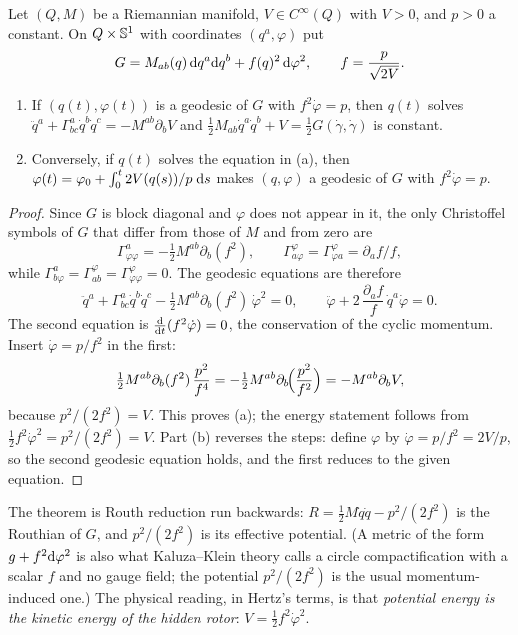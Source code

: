 \begin{theorem}\label{thm:hz-cyclic}
Let $(Q,M)$ be a Riemannian manifold, $V\in C^\infty(Q)$ with $V>0$, and
$p>0$ a constant. On $Q\times\mathbb{S}^1$ with coordinates $(q^a,\varphi)$ put
\begin{equation}\label{eq:hz-warped}
  G=M_{ab}(q)\,\mathrm{d} q^a\mathrm{d} q^b+f(q)^2\,\mathrm{d}\varphi^2,\qquad f=\frac{p}{\sqrt{2V}} .
\end{equation}
\begin{enumerate}[label=(\alph*),nosep]
  \item If $(q(t),\varphi(t))$ is a geodesic of $G$ with $f^2\dot\varphi=p$, then
        $q(t)$ solves $\ddot q^a+\Gamma^a_{bc}\dot q^b\dot q^c=-M^{ab}\partial_bV$ and
        $\tfrac12M_{ab}\dot q^a\dot q^b+V=\tfrac12G(\dot\gamma,\dot\gamma)$ is constant.
  \item Conversely, if $q(t)$ solves the equation in (a), then
        $\varphi(t)=\varphi_0+\int_0^t 2V(q(s))/p\;\mathrm{d} s$ makes
        $(q,\varphi)$ a geodesic of $G$ with $f^2\dot\varphi=p$.
\end{enumerate}
\end{theorem}

\begin{proof}
Since $G$ is block diagonal and $\varphi$ does not appear in it, the only
Christoffel symbols of $G$ that differ from those of $M$ and from zero are
\[
  \Gamma^a_{\varphi\varphi}=-\tfrac12M^{ab}\partial_b(f^2),\qquad
  \Gamma^\varphi_{a\varphi}=\Gamma^\varphi_{\varphi a}=\partial_af/f ,
\]
while $\Gamma^a_{b\varphi}=\Gamma^\varphi_{ab}=\Gamma^\varphi_{\varphi\varphi}=0$.
The geodesic equations are therefore
\[
  \ddot q^a+\Gamma^a_{bc}\dot q^b\dot q^c-\tfrac12M^{ab}\partial_b(f^2)\,\dot\varphi^2=0,
  \qquad
  \ddot\varphi+2\,\frac{\partial_af}{f}\,\dot q^a\dot\varphi=0 .
\]
The second equation is $\frac{\mathrm{d}}{\mathrm{d} t}(f^2\dot\varphi)=0$, the conservation of
the cyclic momentum. Insert $\dot\varphi=p/f^2$ in the first:
\[
  \tfrac12M^{ab}\partial_b(f^2)\,\frac{p^2}{f^4}
  =-\tfrac12M^{ab}\partial_b\!\Bigl(\frac{p^2}{f^2}\Bigr)
  =-M^{ab}\partial_b V ,
\]
because $p^2/(2f^2)=V$. This proves (a); the energy statement follows from
$\tfrac12f^2\dot\varphi^2=p^2/(2f^2)=V$. Part (b) reverses the steps: define
$\varphi$ by $\dot\varphi=p/f^2=2V/p$, so the second geodesic equation holds, and
the first reduces to the given equation.
\end{proof}

The theorem is Routh reduction run backwards: $R=\tfrac12M\dot q\dot q-p^2/(2f^2)$
is the Routhian of $G$, and $p^2/(2f^2)$ is its effective potential.
(A metric of the form $g+f^2\mathrm{d}\varphi^2$ is also what Kaluza--Klein
theory calls a circle compactification with a scalar $f$ and no gauge field;
the potential $p^2/(2f^2)$ is the usual momentum-induced one.)
The physical reading, in Hertz's terms, is that \emph{potential energy is the
kinetic energy of the hidden rotor}: $V=\tfrac12f^2\dot\varphi^2$.

